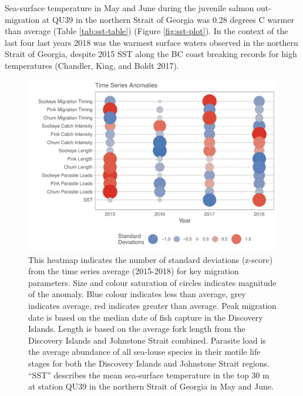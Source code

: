 \documentclass[fleqn,10pt]{wlpeerj} %
\begin{document}
Sea-surface temperature in May and June during the juvenile salmon out-migration at QU39 in the northern Strait of Georgia was 0.28 degrees C warmer than average (Table \ref{tab:sst-table}) (Figure \ref{fig:sst-plot}). In the context of the last four last years 2018 was the warmest surface waters observed in the northern Strait of Georgia, despite 2015 SST along the BC coast breaking records for high temperatures (Chandler, King, and Boldt 2017).

\begin{figure}[H]
\includegraphics[width=0.95\linewidth]{Migration_Observations_Report_files/figure-latex/heatmap-1} \caption{This heatmap indicates the number of standard deviations (z-score) from the time series average (2015-2018) for key migration parameters. Size and colour saturation of circles indicates magnitude of the anomaly. Blue colour indicates less than average, grey indicates average, red indicates greater than average. Peak migration date is based on the median date of fish capture in the Discovery Islands. Length is based on the average fork length from the Discovery Islands and Johnstone Strait combined. Parasite load is the average abundance of all sea-louse species in their motile life stages for both the Discovery Islands and Johnstone Strait regions. “SST” describes the mean sea-surface temperature in the top 30 m at station QU39 in the northern Strait of Georgia in May and June.}\label{fig:heatmap}
\end{figure}
\end{document}
